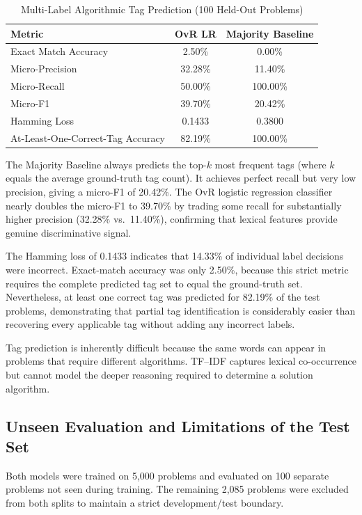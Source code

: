 \documentclass[conference]{IEEEtran}
\begin{document}
\begin{table}[htbp]
\caption{Multi-Label Algorithmic Tag Prediction (100 Held-Out Problems)}
\centering
\begin{tabular}{lcc}
\toprule
Metric & OvR LR & Majority Baseline \\
\midrule
Exact Match Accuracy & 2.50\% & 0.00\% \\
Micro-Precision & 32.28\% & 11.40\% \\
Micro-Recall & 50.00\% & 100.00\% \\
Micro-F1 & 39.70\% & 20.42\% \\
Hamming Loss & 0.1433 & 0.3800 \\
At-Least-One-Correct-Tag Accuracy & 82.19\% & 100.00\% \\
\bottomrule
\end{tabular}
\label{tab:tag_metrics}
\end{table}

The Majority Baseline always predicts the top-$k$ most frequent tags (where
$k$ equals the average ground-truth tag count). It achieves perfect recall
but very low precision, giving a micro-F1 of 20.42\%. The OvR logistic
regression classifier nearly doubles the micro-F1 to 39.70\% by trading
some recall for substantially higher precision (32.28\% vs.\ 11.40\%),
confirming that lexical features provide genuine discriminative signal.

The Hamming loss of 0.1433 indicates that 14.33\% of individual
label decisions were incorrect. Exact-match accuracy was only 2.50\%,
because this strict metric requires the complete predicted tag set to equal
the ground-truth set. Nevertheless, at least one correct tag was predicted
for 82.19\% of the test problems, demonstrating that partial tag
identification is considerably easier than recovering every applicable tag
without adding any incorrect labels.

Tag prediction is inherently difficult because the same words can appear in
problems that require different algorithms. TF--IDF captures lexical
co-occurrence but cannot model the deeper reasoning required to determine
a solution algorithm.

\subsection{Unseen Evaluation and Limitations of the Test Set}
Both models were trained on 5,000 problems and evaluated on 100 separate
problems not seen during training. The remaining 2,085 problems were
excluded from both splits to maintain a strict development/test boundary.
\end{document}
